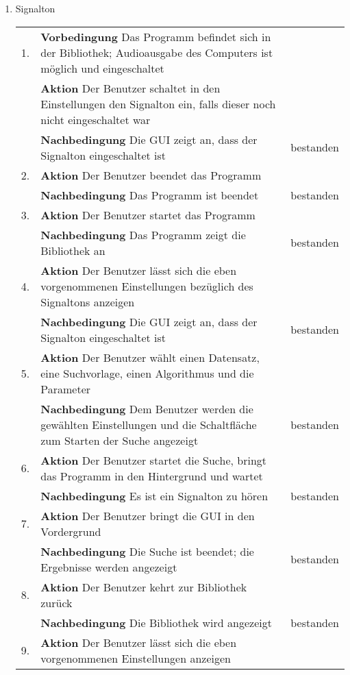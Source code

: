 \begin{enumerate} [label=\bfseries /TSW \arabic*0/, leftmargin=*]
	\item Signalton \newline \newline
	\begin{tabular}{@{}rp{4in}|l}
	1. & \textbf{Vorbedingung} Das Programm befindet sich in der Bibliothek; Audioausgabe des Computers ist möglich und eingeschaltet & \\
	   & \textbf{Aktion} Der Benutzer schaltet in den Einstellungen den Signalton ein, falls dieser noch nicht eingeschaltet war & \\ 
	   & \textbf{Nachbedingung} Die GUI zeigt an, dass der Signalton eingeschaltet ist & bestanden \\
	\hline
	2. & \textbf{Aktion} Der Benutzer beendet das Programm & \\
	   & \textbf{Nachbedingung} Das Programm ist beendet & bestanden \\
	\hline
	3. & \textbf{Aktion} Der Benutzer startet das Programm & \\
	   & \textbf{Nachbedingung} Das Programm zeigt die Bibliothek an & bestanden \\
	\hline
	4. & \textbf{Aktion} Der Benutzer lässt sich die eben vorgenommenen Einstellungen bezüglich des Signaltons anzeigen & \\
	   & \textbf{Nachbedingung} Die GUI zeigt an, dass der Signalton eingeschaltet ist & bestanden \\
	\hline
	5. & \textbf{Aktion} Der Benutzer wählt einen Datensatz, eine Suchvorlage, einen Algorithmus und die Parameter & \\
	   & \textbf{Nachbedingung} Dem Benutzer werden die gewählten Einstellungen und die Schaltfläche zum Starten der Suche angezeigt & bestanden \\
	\hline
	6. & \textbf{Aktion} Der Benutzer startet die Suche, bringt das Programm in den Hintergrund und wartet & \\
	   & \textbf{Nachbedingung} Es ist ein Signalton zu hören & bestanden \\
	\hline
	7. & \textbf{Aktion} Der Benutzer bringt die GUI in den Vordergrund & \\
	   & \textbf{Nachbedingung} Die Suche ist beendet; die Ergebnisse werden angezeigt & bestanden \\
	\hline
	8. & \textbf{Aktion} Der Benutzer kehrt zur Bibliothek zurück & \\
	   & \textbf{Nachbedingung} Die Bibliothek wird angezeigt & bestanden \\
	\hline
	9. & \textbf{Aktion} Der Benutzer lässt sich die eben vorgenommenen Einstellungen anzeigen & \\

\end{tabular}
\end{enumerate}
